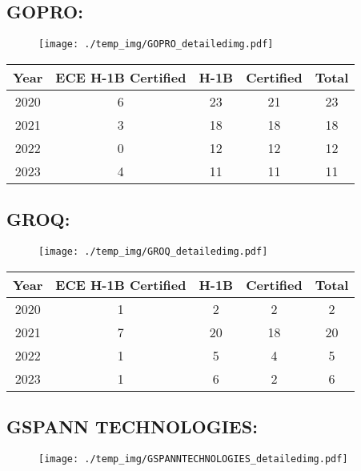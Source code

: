 \documentclass{article}%
\begin{document}
%
\newpage%
\subsection{GOPRO:}%
\label{subsec:GOPRO}%
\label{GOPROdetailed}%


\begin{figure}[htbp]%
\centering%
\texttt{[image: ./temp\_img/GOPRO\_detailedimg.pdf]}%
\end{figure}

%
\begin{longtable}{c|c|c|c|c}%
\hline%
Year&ECE H{-}1B Certified&H{-}1B&Certified&Total\\%
\hline%
2020&6&23&21&23\\%
\hline%
2021&3&18&18&18\\%
\hline%
2022&0&12&12&12\\%
\hline%
2023&4&11&11&11\\%
\hline%
\end{longtable}

%
\newpage%
\subsection{GROQ:}%
\label{subsec:GROQ}%
\label{GROQdetailed}%


\begin{figure}[htbp]%
\centering%
\texttt{[image: ./temp\_img/GROQ\_detailedimg.pdf]}%
\end{figure}

%
\begin{longtable}{c|c|c|c|c}%
\hline%
Year&ECE H{-}1B Certified&H{-}1B&Certified&Total\\%
\hline%
2020&1&2&2&2\\%
\hline%
2021&7&20&18&20\\%
\hline%
2022&1&5&4&5\\%
\hline%
2023&1&6&2&6\\%
\hline%
\end{longtable}

%
\newpage%
\subsection{GSPANN TECHNOLOGIES:}%
\label{subsec:GSPANNTECHNOLOGIES}%
\label{GSPANNTECHNOLOGIESdetailed}%


\begin{figure}[htbp]%
\centering%
\texttt{[image: ./temp\_img/GSPANNTECHNOLOGIES\_detailedimg.pdf]}%
\end{figure}
\end{document}
